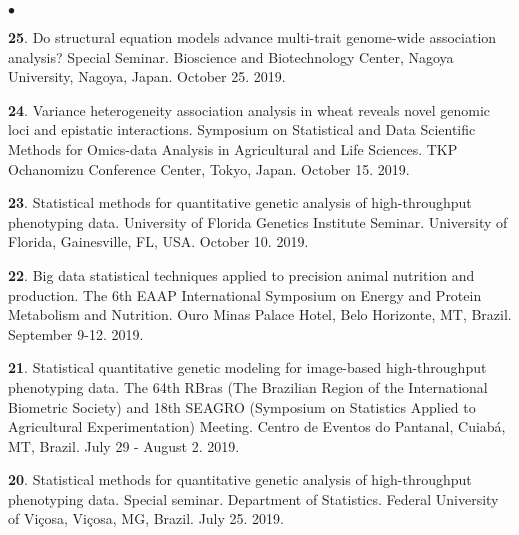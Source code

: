 \documentclass[margin,line,10pt]{res}
\newenvironment{list2}{
  \begin{list}{$\bullet$}{%
      \setlength{\itemsep}{0in}
      \setlength{\parsep}{0in} \setlength{\parskip}{0in}
      \setlength{\topsep}{0in} \setlength{\partopsep}{0in} 
      \setlength{\leftmargin}{0.2in}}}{\end{list}}
\begin{document}
\begin{resume}
\begin{list2}
\item [{\bf 25}.] Do structural equation models advance multi-trait genome-wide association analysis? Special Seminar. Bioscience and Biotechnology Center, Nagoya University, Nagoya, Japan. October 25. 2019.  
  
  \vspace{0.5cm}
  
   \item [{\bf 24}.] Variance heterogeneity association analysis in wheat reveals novel genomic loci and epistatic interactions. Symposium on Statistical and Data Scientific Methods for Omics-data Analysis in Agricultural and Life Sciences. TKP Ochanomizu Conference Center, Tokyo, Japan. October 15. 2019. 

     \vspace{0.5cm}
    
  \item [{\bf 23}.] Statistical methods for quantitative genetic analysis of high-throughput phenotyping data.  University of Florida Genetics Institute Seminar. University of Florida, Gainesville, FL, USA. October 10. 2019. 

    \vspace{0.5cm}
    
\item [{\bf 22}.]  Big data statistical techniques applied to precision animal nutrition and production. The 6th EAAP International Symposium on Energy and Protein Metabolism and Nutrition. Ouro Minas Palace Hotel, Belo Horizonte, MT, Brazil. September 9-12. 2019. 

  \vspace{0.5cm}
  
 \item [{\bf 21}.] Statistical quantitative genetic modeling for image-based high-throughput phenotyping data. The 64th RBras (The Brazilian  Region  of the International Biometric Society) and 18th SEAGRO (Symposium on Statistics Applied to Agricultural Experimentation) Meeting. Centro de Eventos do Pantanal, Cuiab{\'a}, MT, Brazil. July 29 - August 2. 2019. 

   \vspace{0.5cm}

   
 \item [{\bf 20}.]      
     Statistical methods for quantitative genetic analysis of high-throughput phenotyping data. Special seminar. Department of Statistics. Federal University of Vi\c cosa, Vi\c cosa, MG, Brazil. July 25. 2019. 
   

\end{list2}
\end{resume}
\end{document}
